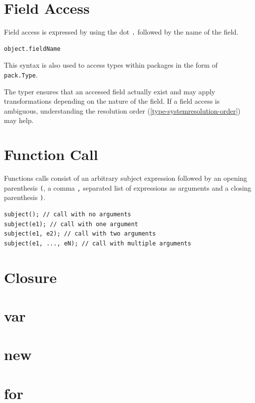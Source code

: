\documentclass[a4paper,oneside]{book}
\newcommand{\expr}[1]{\texttt{#1}}
\newcommand{\tref}[2]{#1 (\ref{#2})}
\begin{document}
\section{Field Access}
\label{expression-field-access}

Field access is expressed by using the dot \expr{.} followed by the name of the field.

\begin{lstlisting}
object.fieldName
\end{lstlisting}

This syntax is also used to access types within packages in the form of \expr{pack.Type}. 

The typer ensures that an accessed field actually exist and may apply transformations depending on the nature of the field. If a field access is ambiguous, understanding the \tref{resolution order}{type-systemresolution-order} may help.


\section{Function Call}
\label{expression-function-call}

Functions calls consist of an arbitrary subject expression followed by an opening parenthesis \expr{(}, a comma \expr{,} separated list of expressions as arguments and a closing parenthesis \expr{)}.

\begin{lstlisting}
subject(); // call with no arguments
subject(e1); // call with one argument
subject(e1, e2); // call with two arguments
subject(e1, ..., eN); // call with multiple arguments
\end{lstlisting}




\section{Closure}
\label{expression-closure}

\section{var}
\label{expression-var}

\section{new}
\label{expression-new}

\section{for}
\label{expression-for}
\end{document}
